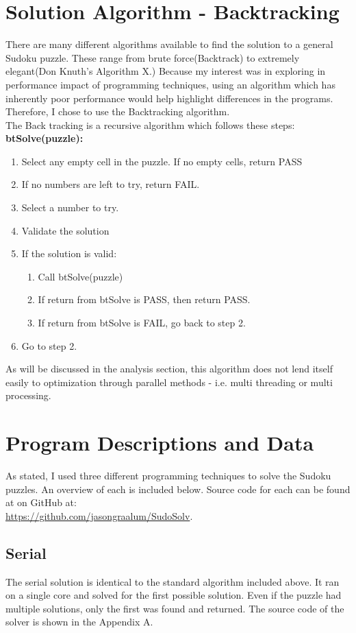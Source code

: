 \documentclass[11pt, a4paper]{article} %
\begin{document}
\section{Solution Algorithm - Backtracking}
There are many different algorithms available to find the solution to a general Sudoku puzzle.  These range from brute force(Backtrack) to extremely elegant(Don Knuth's Algorithm X.) Because my interest was in exploring in performance impact of programming techniques, using an algorithm which has inherently poor performance would help highlight differences in the programs.  Therefore, I chose to use the Backtracking algorithm.\\
The Back tracking is a recursive algorithm which follows these steps:
\linespread{1}
\textbf{btSolve(puzzle): }
\begin{enumerate}
\item Select any empty cell in the puzzle. If no empty cells, return PASS
\item If no numbers are left to try, return FAIL.
\item Select a number to try.
\item Validate the solution
\item If the solution is valid:
	\begin{enumerate}
	\item Call btSolve(puzzle)
	\item If return from btSolve is PASS, then return PASS.
	\item If return from btSolve is FAIL, go back to step 2.
	\end{enumerate} 
\item Go to step 2.
\end{enumerate}
\linespread{1.5}
As will be discussed in the analysis section, this algorithm does not lend itself easily to optimization through parallel methods - i.e. multi threading or multi processing.

\section{Program Descriptions and Data}
As stated, I used three different programming techniques to solve the Sudoku puzzles. An overview of each is included below.  Source code for each can be found at on GitHub at:\\ \href{https://github.com/jasongraalum/SudoSolv/}{https://github.com/jasongraalum/SudoSolv}. \\
\subsection{Serial}
The serial solution is identical to the standard algorithm included above. It ran on a single core and solved for the first possible solution. Even if the puzzle had multiple solutions, only the first was found and returned. The source code of the solver is shown in the Appendix A. \\
\end{document}
